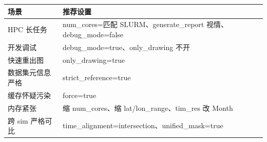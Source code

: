 \begin{longtable}{p{4cm} p{8cm}}
  \toprule
  场景 & 推荐设置 \\
  \midrule
  \endhead
  HPC 长任务 & num\_cores=匹配 SLURM、generate\_report 视情、debug\_mode=false \\
  开发调试 & debug\_mode=true、only\_drawing 不开 \\
  快速重出图 & only\_drawing=true \\
  数据集元信息严格 & strict\_reference=true \\
  缓存怀疑污染 & force=true \\
  内存紧张 & 缩 num\_cores、缩 lat/lon\_range、tim\_res 改 Month \\
  跨 sim 严格可比 & time\_alignment=intersection、unified\_mask=true \\
  \bottomrule
\end{longtable}
